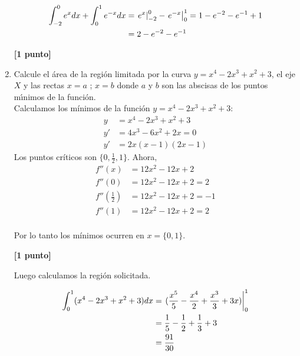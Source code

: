 \documentclass[letterpaper,10pt]{article}
\newcommand{\dis}{\displaystyle}
\begin{document}
\begin{enumerate}
\begin{figure}[!htb]\centering
   \begin{minipage}{0.6\textwidth}
     
   \end{minipage}
   \begin {minipage}{0.3\textwidth}
     
   \end{minipage}
\end{figure}

\begin{align*}
\dis \int_{-2}^0 e^{x}dx + \int_{0}^1 e^{-x}dx &= \displaystyle   \left.e^{x}\right|_{-2}^{0} - \left.e^{-x}\right|_{0}^{1} = 1 - e^{-2}-e^{-1}+1 \\
\dis  &= 2 - e^{-2}-e^{-1}
\end{align*}

\dotfill\textbf{[1 punto]}


\newpage
\item Calcule el \'{a}rea de la regi\'{o}n limitada por la curva
$y=x^4-2x^3+x^2+3$, el eje $X$ y las rectas $x=a$ ; $x=b$ donde  $a$
y $b$ son las abscisas de los puntos m\'{\i}nimos de la funci\'{o}n.\\

Calculamos los mínimos de la función  $y=x^4-2x^3+x^2+3$:\\
\begin{align*}
\dis y &= x^4-2x^3+x^2+3\\
\dis y' &= 4x^3- 6x^2+2x =0\\
\dis y' &= 2x(x-1)(2x-1)
\end{align*}
Los puntos críticos son $\{0,\frac{1}{2},1\}$. Ahora,
\begin{align*}
\dis f''(x) &=12x^2-12x+2\\
\dis f''(0) &=12x^2-12x+2 = 2\\
\dis  f''(\frac{1}{2}) &=12x^2-12x+2 = -1\\
\dis  f''(1) &=12x^2-12x+2 = 2\\
\end{align*}

Por lo tanto los mínimos ocurren en $x =\{0,1\}$.

\dotfill\textbf{[1 punto]}

Luego calculamos la región solicitada.

\begin{align*}
\dis \int_{0}^1 (x^4-2x^3+x^2+3)dx &= \displaystyle   \left.(\frac{x^5}{5}- \frac{x^4}{2} + \frac{x^3}{3} + 3x)\right|_{0}^{1}\\
\dis  &= \frac{1}{5} - \frac{1}{2} + \frac{1}{3} + 3\\
\dis  &= \frac{91}{30}
\end{align*}


\end{enumerate}
\end{document}
